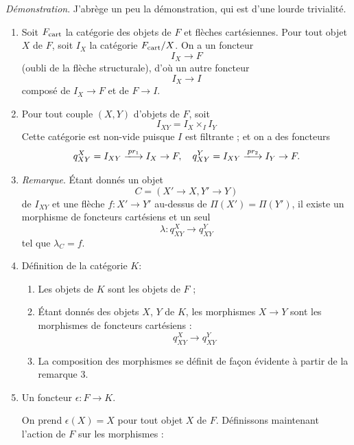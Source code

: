 {\it Démonstration}. J'abrège un peu la démonstration, qui est d'une lourde trivialité. 
\begin{enumerate}
    \item[1)] Soit $F_{\operatorname{cart}}$ la catégorie des objets de $F$ et flèches cartésiennes. Pour tout objet $X$ de $F$, soit $I_X$ la catégorie $F_{\operatorname{cart}}/X$. On a un foncteur
    $$
    I_X \to F
    $$
    (oubli de la flèche structurale), d'où un autre foncteur
    $$
    I_X \to I
    $$
    composé de $I_X \to F$ et de $F \to I$.
    \item[2)] Pour tout couple $(X, Y)$ d'objets de $F$, soit
    $$
    I_{XY} = I_{X} \times_I I_Y
    $$
    Cette catégorie est non-vide puisque $I$ est filtrante ; et on a des foncteurs 
    $$
    q^X_{XY} = I_{XY} \xlongrightarrow{pr_1} I_X \to F, \quad q^Y_{XY} = I_{XY} \xlongrightarrow{pr_2} I_Y \to F.
    $$
    \item[3)] \emph{Remarque}. Étant donnés un objet
    $$
    C = (X' \to X, Y' \to Y)
    $$
    de $I_{XY}$ et une flèche $f: X' \to Y'$ au-dessus de $\Pi(X') = \Pi(Y')$, il existe un morphisme de foncteurs cartésiens et un seul
    $$
    \lambda: q^X_{XY} \to q^Y_{XY}
    $$
    tel que $\lambda_C = f$.
    \item[4)] Définition de la catégorie $K$:
    \begin{enumerate}
        \item[a)] Les objets de $K$ sont les objets de $F$ ;
        \item[b)] Étant donnés des objets $X$, $Y$ de $K$, les morphismes $X \to Y$ sont les morphismes de foncteurs cartésiens :
        $$
        q^X_{XY} \to q^Y_{XY}
        $$
        \item[c)] La composition des morphismes se définit de fa\c{c}on évidente à partir de la remarque 3.
    \end{enumerate}
    \item[5)] Un foncteur $\epsilon: F \to K$. 
    
    On prend $\epsilon(X) = X$ pour tout objet $X$ de $F$. Définissons maintenant l'action de $F$ sur les morphismes :
    

\end{enumerate}
